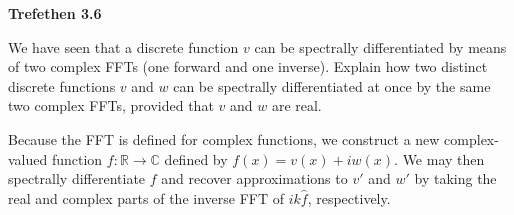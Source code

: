 \textbf{Trefethen 3.6}

We have seen that a discrete function $v$ can be spectrally differentiated by means of two complex FFTs (one forward
and one inverse). Explain how two distinct discrete functions $v$ and $w$ can be spectrally differentiated at once by
the same two complex FFTs, provided that $v$ and $w$ are real.


\begin{solution}
  Because the FFT is defined for complex functions, we construct a new complex-valued function 
  $f:\mathbb{R} \to \mathbb{C}$ defined by $f(x) = v(x) + i w(x)$. We may then spectrally differentiate $f$ and recover
  approximations to $v'$ and $w'$ by taking the real and complex parts of the inverse FFT of $i k \hat{f}$, respectively.
  \ \\
\end{solution}